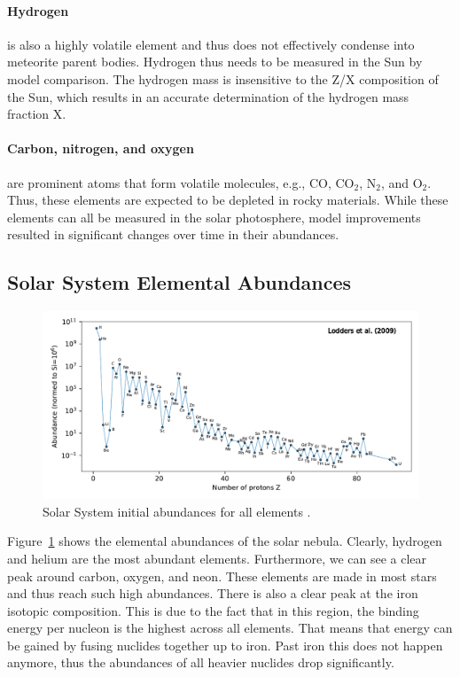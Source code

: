 \paragraph{Hydrogen} is also a highly volatile element and thus does not effectively condense into meteorite parent bodies. Hydrogen thus needs to be measured in the Sun by model comparison. The hydrogen mass is insensitive to the Z/X composition of the Sun, which results in an accurate determination of the hydrogen mass fraction X.

\paragraph{Carbon, nitrogen, and oxygen} are prominent atoms that form volatile molecules, e.g., CO, CO$_2$, N$_2$, and O$_2$. Thus, these elements are expected to be depleted in rocky materials. While these elements can all be measured in the solar photosphere, model improvements resulted in significant changes over time in their abundances.

\subsection{Solar System Elemental Abundances}

\begin{figure}[bt] \centering
    \includegraphics[width=\textwidth]{graphics/solar_system_abundances/solar_system_abundances}
    \caption{Solar System initial abundances for all elements \citep{lodders09}.}
    \label{fig:solar_system_abundances}
\end{figure}
Figure~\ref{fig:solar_system_abundances} shows the elemental abundances of the solar nebula. Clearly, hydrogen and helium are the most abundant elements. Furthermore, we can see a clear peak around carbon, oxygen, and neon. These elements are made in most stars and thus reach such high abundances. There is also a clear peak at the iron isotopic composition. This is due to the fact that in this region, the binding energy per nucleon is the highest across all elements. That means that energy can be gained by fusing nuclides together up to iron. Past iron this does not happen anymore, thus the abundances of all heavier nuclides drop significantly.

